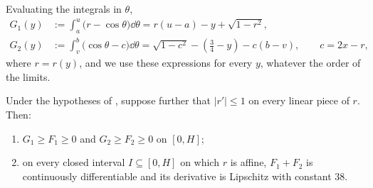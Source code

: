 \documentclass[11pt,colorlinks]{charlie}
\begin{document}
Evaluating the integrals in $\theta$,
\begin{equation}\label{eq:G12}
\begin{aligned}
 G_1(y)&:=\int_a^u\big(r-\cos\theta\big)\dd\theta=r(u-a)-y+\sqrt{1-r^2},\\
 G_2(y)&:=\int_v^b\big(\cos\theta-c\big)\dd\theta=\sqrt{1-c^2}-(\tfrac34-y)-c(b-v),\qquad c=2x-r,
\end{aligned}
\end{equation}
where $r=r(y)$, and we use these expressions for every $y$, whatever the order of the limits.

\begin{lemma}\label{lem:heightint}
Under the hypotheses of , suppose further that $|r'|\le1$ on every linear piece of $r$. Then:
\begin{enumerate}
\item $G_1\ge F_1\ge0$ and $G_2\ge F_2\ge0$ on $[0,H]$;
\item on every closed interval $I\subseteq[0,H]$ on which $r$ is affine, $F_1+F_2$ is continuously differentiable and its derivative is Lipschitz with constant $38$.
\end{enumerate}
\end{lemma}
\end{document}
